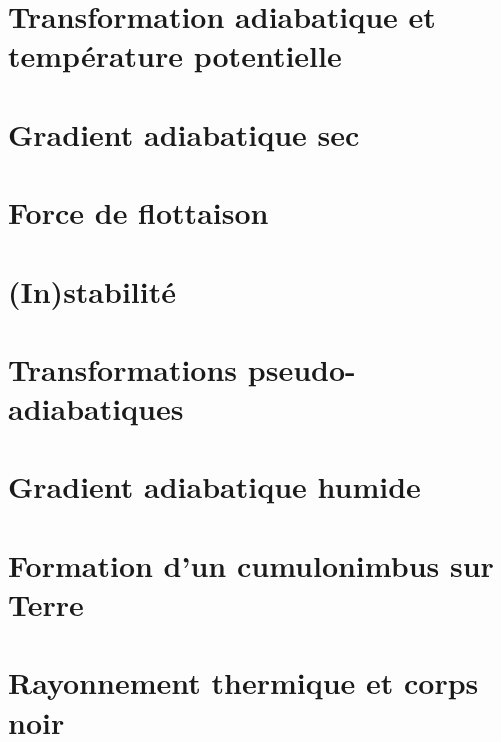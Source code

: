\documentclass[a4paper,DIV16,10pt]{scrartcl}
\begin{document}
\newpage
\section{Transformation adiabatique et température potentielle}

\section{Gradient adiabatique sec}


\newpage
\section{Force de flottaison}


\newpage
\section{(In)stabilité}


\newpage
\section{Transformations pseudo-adiabatiques}


\newpage
\section{Gradient adiabatique humide}


\newpage
\section{Formation d'un cumulonimbus sur Terre}


%

\newpage
\section{Rayonnement thermique et corps noir}


\end{document}
